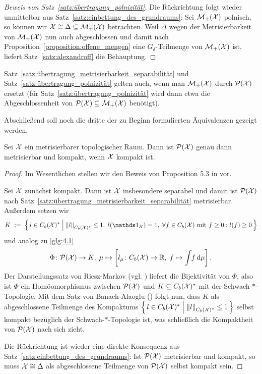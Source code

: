 \documentclass[../thesis/thesis.tex]{subfiles}
\begin{document}
\begin{proof}[Beweis von Satz~\ref{satz:übertragung_polnizität}]
		Die Rückrichtung folgt wieder unmittelbar aus Satz~\ref{satz:einbettung_des_grundraums}: Sei $\mathcal{M}_{+}(\mathcal{X})$ polnisch, 
		so können wir $\mathcal{X} \cong \Delta \subseteq \mathcal{M}_{+}(\mathcal{X})$ betrachten. Weil $\Delta$ wegen der Metrisierbarkeit von $\mathcal{M}_{+}(\mathcal{X})$ nun auch abgeschlossen und damit nach 
		Proposition~\ref{proposition:offene_mengen} eine $G_\delta$-Teilmenge von $\mathcal{M}_{+}(\mathcal{X})$ ist, liefert Satz~\ref{satz:alexandroff} die Behauptung.
	\end{proof}

	\begin{Bemerkung}
		Satz~\ref{satz:übertragung_metrisierbarkeit_separabilität} und Satz~\ref{satz:übertragung_polnizität} gelten auch, wenn man $\mathcal{M}_{+}(\mathcal{X})$ durch $\mathcal{P}(\mathcal{X})$ ersetzt 
		(für Satz~\ref{satz:übertragung_polnizität} wird dann etwa die Abgeschlossenheit von $\mathcal{P}(\mathcal{X}) \subseteq \mathcal{M}_{+}(\mathcal{X})$ benötigt).
	\end{Bemerkung}

	Abschließend soll noch die dritte der zu Beginn formulierten Äquivalenzen gezeigt werden.

	\begin{Satz}
		\label{satz:übertragung_kompaktheit}
		Sei $\mathcal{X}$ ein metrisierbarer topologischer Raum. Dann ist $\mathcal{P}(\mathcal{X})$ genau dann metrisierbar und kompakt, wenn $\mathcal{X}$ kompakt ist.
	\end{Satz}
	
	\begin{proof}
		Im Wesentlichen stellen wir den Beweis von Proposition 5.3 in \cite{vanGaans.200203} vor.
		
		Sei $\mathcal{X}$ zunächst kompakt. Dann ist $\mathcal{X}$ insbesondere separabel und damit ist $\mathcal{P}(\mathcal{X})$ 
		nach Satz~\ref{satz:übertragung_metrisierbarkeit_separabilität} metrisierbar.
		Außerdem setzen wir
		\[ K \; \defby \; \setcomp{l \in \Bdcontfct{\X}^\ast}{\norm{l}_{\Bdcontfct{\X}^\ast} \leq 1, \; l(\indfct_{\X}) = 1, \; 
			\forall f \in \Bdcontfct{\X} \text{ mit } f \geq 0 : l(f) \geq 0}\]
		und analog zu \eqref{glg:4.1}
		\[ \Phi \colon \mathcal{P}(\mathcal{X}) \to K, \; \mu \mapsto \left[l_\mu \colon C_b(\mathcal{X}) \to \mathbb{R}, \; f \mapsto \int_{} \, f \, \mathrm{d}\mu \right]  \text{.} \]
		Der Darstellungssatz von Riesz-Markov (vgl. \cite[Theorem 4.8.8]{Simon.2015}) liefert die Bijektivität von $\Phi$, also ist $\Phi$ ein 
		Homöomorphismus zwischen $\mathcal{P}(\mathcal{X})$ und $K \subseteq C_b(\mathcal{X})^\ast$ 
		mit der Schwach-$\ast$-Topologie. Mit dem Satz von Banach-Alaoglu (\cite[Theorem 5.8.1]{Simon.2015}) folgt nun, dass $K$ als abgeschlossene Teilmenge des Kompaktums 
		$\left\{\, l \in C_b(\mathcal{X})^\ast \; \middle| \; \left\lVert l\right\rVert_{C_b(\mathcal{X})^\ast} \leq 1 \,\right\}$ selbst kompakt bezüglich der Schwach-$\ast$-Topologie ist, 
		was schließlich die Kompaktheit von $\mathcal{P}(\mathcal{X})$ nach sich zieht.
		
		Die Rückrichtung ist wieder eine direkte Konsequenz aus Satz~\ref{satz:einbettung_des_grundraums}: Ist $\mathcal{P}(\mathcal{X})$ metrisierbar und kompakt, so muss 
		$\mathcal{X} \cong \Delta$ als abgeschlossene Teilmenge von $\mathcal{P}(\mathcal{X})$ selbst kompakt sein.
	\end{proof}
\end{document}
